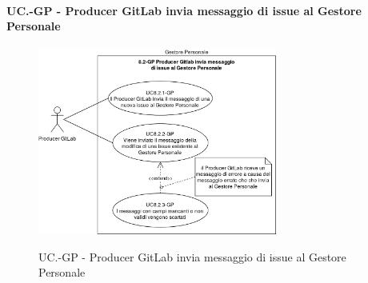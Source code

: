 	\paragraph{UC\theuccount.\thesubuccount-GP -  Producer GitLab invia messaggio di issue al Gestore Personale}
		\begin{figure}[H]
			\centering
			\includegraphics[width=0.7\textwidth]{img/casi_d'uso/UC8_2.png}\\
			\caption{UC\theuccount.\thesubuccount-GP -  Producer GitLab invia messaggio di issue al Gestore Personale}
		\end{figure}

